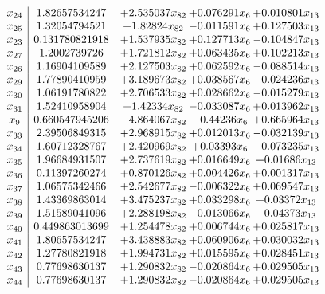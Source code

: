 \documentclass[11pt]{article}
\begin{document}
\[\begin{array}{c| c c@{\hskip 2pt} c@{\hskip 2pt} c@{\hskip 2pt} }
 x_{24}   &  1.82657534247 & + 2.535037 x_{82} & + 0.076291 x_{6} & + 0.010801 x_{13}\\
 x_{25}   &  1.32054794521 & + 1.82824 x_{82} & -0.011591 x_{6} & + 0.127503 x_{13}\\
 x_{23}   &  0.131780821918 & + 1.537935 x_{82} & + 0.127713 x_{6} & -0.104847 x_{13}\\
 x_{27}   &  1.2002739726 & + 1.721812 x_{82} & + 0.063435 x_{6} & + 0.102213 x_{13}\\
 x_{26}   &  1.16904109589 & + 2.127503 x_{82} & + 0.062592 x_{6} & -0.088514 x_{13}\\
 x_{29}   &  1.77890410959 & + 3.189673 x_{82} & + 0.038567 x_{6} & -0.024236 x_{13}\\
 x_{30}   &  1.06191780822 & + 2.706533 x_{82} & + 0.028662 x_{6} & -0.015279 x_{13}\\
 x_{31}   &  1.52410958904 & + 1.42334 x_{82} & -0.033087 x_{6} & + 0.013962 x_{13}\\
 x_{9}   &  0.660547945206 & -4.864067 x_{82} & -0.44236 x_{6} & + 0.665964 x_{13}\\
 x_{33}   &  2.39506849315 & + 2.968915 x_{82} & + 0.012013 x_{6} & -0.032139 x_{13}\\
 x_{34}   &  1.60712328767 & + 2.420969 x_{82} & + 0.03393 x_{6} & -0.073235 x_{13}\\
 x_{35}   &  1.96684931507 & + 2.737619 x_{82} & + 0.016649 x_{6} & + 0.01686 x_{13}\\
 x_{36}   &  0.11397260274 & + 0.870126 x_{82} & + 0.004426 x_{6} & + 0.001317 x_{13}\\
 x_{37}   &  1.06575342466 & + 2.542677 x_{82} & -0.006322 x_{6} & + 0.069547 x_{13}\\
 x_{38}   &  1.43369863014 & + 3.475237 x_{82} & + 0.033298 x_{6} & + 0.03372 x_{13}\\
 x_{39}   &  1.51589041096 & + 2.288198 x_{82} & -0.013066 x_{6} & + 0.04373 x_{13}\\
 x_{40}   &  0.449863013699 & + 1.254478 x_{82} & + 0.006744 x_{6} & + 0.025817 x_{13}\\
 x_{41}   &  1.80657534247 & + 3.438883 x_{82} & + 0.060906 x_{6} & + 0.030032 x_{13}\\
 x_{42}   &  1.27780821918 & + 1.994731 x_{82} & + 0.015595 x_{6} & + 0.028451 x_{13}\\
 x_{43}   &  0.77698630137 & + 1.290832 x_{82} & -0.020864 x_{6} & + 0.029505 x_{13}\\
 x_{44}   &  0.77698630137 & + 1.290832 x_{82} & -0.020864 x_{6} & + 0.029505 x_{13}\\

\end{array}\]
\end{document}

